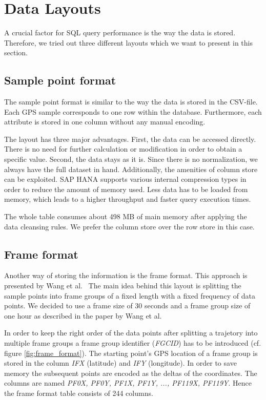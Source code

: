 \documentclass[10pt]{sig-alternate}
\begin{document}
\section{Data Layouts}
\label{sec:data_layouts}
A crucial factor for SQL query performance is the way the data is stored. Therefore, we tried out three different layouts which we want to present in this section.
\subsection{Sample point format}
The sample point format is similar to the way the data is stored in the CSV-file. Each GPS sample corresponds to one row within the database. Furthermore, each attribute is stored in one column without any manual encoding.

The layout has three major advantages. First, the data can be accessed directly. There is no need for further calculation or modification in order to obtain a specific value. Second, the data stays as it is. Since there is no normalization, we always have the full dataset in hand. Additionally, the amenities of column store can be exploited. SAP HANA supports various internal compression types in order to reduce the amount of memory used. Less data has to be loaded from memory, which leads to a higher throughput and faster query execution times.

The whole table consumes about 498 MB of main memory after applying the data cleansing rules. We prefer the column store over the row store in this case.

\subsection{Frame format}
Another way of storing the information is the frame format. This approach is presented by Wang et al.~\cite{wang} The main idea behind this layout is splitting the sample points into frame groups of a fixed length with a fixed frequency of data points. We decided to use a frame size of 30 seconds and a frame group size of one hour as described in the paper by Wang et al.

In order to keep the right order of the data points after splitting a trajetory into multiple frame groups a frame group identifier (\textit{FGCID}) has to be introduced (cf. figure \ref{fig:frame_format}). The starting point's GPS location of a frame group is stored in the column \textit{IFX} (latitude) and \textit{IFY} (longitude). In order to save memory the subsequent points are encoded as the deltas of the coordinates. The columns are named \textit{PF0X, PF0Y, PF1X, PF1Y, ..., PF119X, PF119Y}. Hence the frame format table consists of 244 columns.
\end{document}
